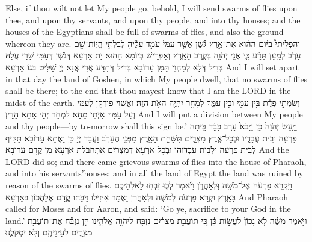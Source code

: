 {{Else, if thou wilt not let My people go, behold, I will send swarms of flies upon thee, and upon thy servants, and upon thy people, and into thy houses; and the houses of the Egyptians shall be full of swarms of flies, and also the ground whereon they are.}{}
{וְהִפְלֵיתִי֩ בַיּ֨וֹם הַה֜וּא אֶת־אֶ֣רֶץ גֹּ֗שֶׁן אֲשֶׁ֤ר עַמִּי֙ עֹמֵ֣ד עָלֶ֔יהָ לְבִלְתִּ֥י הֱיֽוֹת־שָׁ֖ם עָרֹ֑ב לְמַ֣עַן תֵּדַ֔ע כִּ֛י אֲנִ֥י יְהֹוָ֖ה בְּקֶ֥רֶב הָאָֽרֶץ׃
}
{וְאַפְרֵישׁ בְּיוֹמָא הַהוּא יָת אַרְעָא דְּגֹשֶׁן דְּעַמִּי שָׁרֵי עֲלַהּ בְּדִיל דְּלָא לְמִהְוֵי תַּמָּן עָרוֹבָא בְּדִיל דְּתִדַּע אֲרֵי אֲנָא יְיָ שַׁלִּיט בְּגוֹ אַרְעָא׃}
{And I will set apart in that day the land of Goshen, in which My people dwell, that no swarms of flies shall be there; to the end that thou mayest know that I am the LORD in the midst of the earth.}{}
{וְשַׂמְתִּ֣י פְדֻ֔ת בֵּ֥ין עַמִּ֖י וּבֵ֣ין עַמֶּ֑ךָ לְמָחָ֥ר יִהְיֶ֖ה הָאֹ֥ת הַזֶּֽה׃
}
{וַאֲשַׁוֵּי פוּרְקָן לְעַמִּי וְעַל עַמָּךְ אַיְתִי מַחָא לִמְחַר יְהֵי אָתָא הָדֵין׃}
{And I will put a division between My people and thy people—by to-morrow shall this sign be.’}{}
{וַיַּ֤עַשׂ יְהֹוָה֙ כֵּ֔ן וַיָּבֹא֙ עָרֹ֣ב כָּבֵ֔ד בֵּ֥יתָה פַרְעֹ֖ה וּבֵ֣ית עֲבָדָ֑יו וּבְכׇל־אֶ֧רֶץ מִצְרַ֛יִם תִּשָּׁחֵ֥ת הָאָ֖רֶץ מִפְּנֵ֥י הֶעָרֹֽב׃
}
{וַעֲבַד יְיָ כֵּן וַאֲתָא עָרוֹבָא תַּקִּיף לְבֵית פַּרְעֹה וּלְבֵית עַבְדּוֹהִי וּבְכָל אַרְעָא דְּמִצְרַיִם אִתְחַבַּלַת אַרְעָא מִן קֳדָם עָרוֹבָא׃}
{And the LORD did so; and there came grievous swarms of flies into the house of Pharaoh, and into his servants’houses; and in all the land of Egypt the land was ruined by reason of the swarms of flies.}{}
{וַיִּקְרָ֣א פַרְעֹ֔ה אֶל־מֹשֶׁ֖ה וּֽלְאַהֲרֹ֑ן וַיֹּ֗אמֶר לְכ֛וּ זִבְח֥וּ לֵאלֹֽהֵיכֶ֖ם בָּאָֽרֶץ׃
}
{וּקְרָא פַרְעֹה לְמֹשֶׁה וּלְאַהֲרֹן וַאֲמַר אִיזִילוּ דַּבַּחוּ קֳדָם אֱלָהֲכוֹן בְּאַרְעָא׃}
{And Pharaoh called for Moses and for Aaron, and said: ‘Go ye, sacrifice to your God in the land.’}{}
{וַיֹּ֣אמֶר מֹשֶׁ֗ה לֹ֤א נָכוֹן֙ לַעֲשׂ֣וֹת כֵּ֔ן כִּ֚י תּוֹעֲבַ֣ת מִצְרַ֔יִם נִזְבַּ֖ח לַיהֹוָ֣ה אֱלֹהֵ֑ינוּ הֵ֣ן נִזְבַּ֞ח אֶת־תּוֹעֲבַ֥ת מִצְרַ֛יִם לְעֵינֵיהֶ֖ם וְלֹ֥א יִסְקְלֻֽנוּ׃
}}
